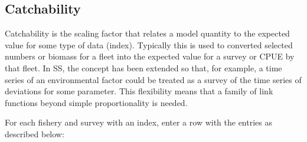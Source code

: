 \hypertarget{Qsetup}{}
\subsection{Catchability}
Catchability is the scaling factor that relates a model quantity to the expected value for some type of data (index).  Typically this is used to converted selected numbers or biomass for a fleet into the expected value for a survey or CPUE by that fleet.  In SS, the concept has been extended so that, for example, a time series of an environmental factor could be treated as a survey of the time series of deviations for some parameter.  This flexibility means that a family of link functions beyond simple proportionality is needed.

For each fishery and survey with an index, enter a row with the entries as described below:

